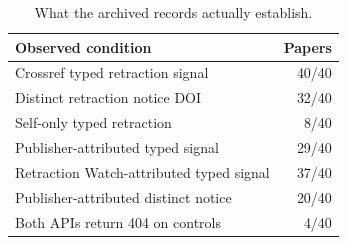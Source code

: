 \begin{table}[t]
\centering\footnotesize
\caption{What the archived records actually establish.}
\label{tab:signals}
\begin{tabular}{lr}
\toprule
Observed condition & Papers \\
\midrule
Crossref typed retraction signal & 40/40 \\
Distinct retraction notice DOI & 32/40 \\
Self-only typed retraction & 8/40 \\
Publisher-attributed typed signal & 29/40 \\
Retraction Watch-attributed typed signal & 37/40 \\
Publisher-attributed distinct notice & 20/40 \\
Both APIs return 404 on controls & 4/40 \\
\bottomrule
\end{tabular}
\end{table}